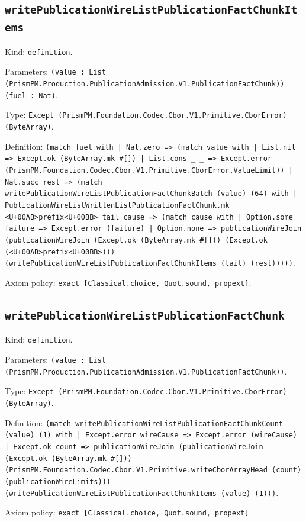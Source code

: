 \documentclass[11pt]{article}
\begin{document}
\subsection*{\texttt{writePublicationWireListPublicationFactChunkItems}}
\noindent Kind: \texttt{definition}.\par
\noindent Parameters: \texttt{(value : List (PrismPM.Production.PublicationAdmission.V1.PublicationFactChunk)) (fuel : Nat)}.\par
\noindent Type: \texttt{Except (PrismPM.Foundation.Codec.Cbor.V1.Primitive.CborError) (ByteArray)}.\par
\noindent Definition: \texttt{(match fuel with | Nat.zero => (match value with | List.nil => Except.ok (ByteArray.mk \#[]) | List.cons \_ \_ => Except.error (PrismPM.Foundation.Codec.Cbor.V1.Primitive.CborError.ValueLimit)) | Nat.succ rest => (match writePublicationWireListPublicationFactChunkBatch (value) (64) with | PublicationWireListWrittenListPublicationFactChunk.mk <U+00AB>prefix<U+00BB> tail cause => (match cause with | Option.some failure => Except.error (failure) | Option.none => publicationWireJoin (publicationWireJoin (Except.ok (ByteArray.mk \#[])) (Except.ok (<U+00AB>prefix<U+00BB>))) (writePublicationWireListPublicationFactChunkItems (tail) (rest)))))}.\par
\noindent Axiom policy: \texttt{exact [Classical.choice, Quot.sound, propext]}.\par
\subsection*{\texttt{writePublicationWireListPublicationFactChunk}}
\noindent Kind: \texttt{definition}.\par
\noindent Parameters: \texttt{(value : List (PrismPM.Production.PublicationAdmission.V1.PublicationFactChunk))}.\par
\noindent Type: \texttt{Except (PrismPM.Foundation.Codec.Cbor.V1.Primitive.CborError) (ByteArray)}.\par
\noindent Definition: \texttt{(match writePublicationWireListPublicationFactChunkCount (value) (1) with | Except.error wireCause => Except.error (wireCause) | Except.ok count => publicationWireJoin (publicationWireJoin (Except.ok (ByteArray.mk \#[])) (PrismPM.Foundation.Codec.Cbor.V1.Primitive.writeCborArrayHead (count) (publicationWireLimits))) (writePublicationWireListPublicationFactChunkItems (value) (1)))}.\par
\noindent Axiom policy: \texttt{exact [Classical.choice, Quot.sound, propext]}.\par
\end{document}
